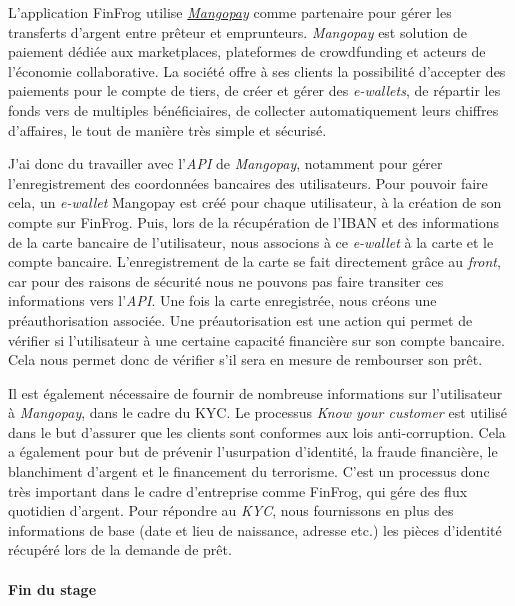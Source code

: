 L'application FinFrog utilise
\href{https://www.mangopay.com/fr/}{\emph{Mangopay}} comme partenaire
pour gérer les transferts d'argent entre prêteur et emprunteurs.
\emph{Mangopay} est solution de paiement dédiée aux marketplaces,
plateformes de crowdfunding et acteurs de l'économie collaborative. La
société offre à ses clients la possibilité d'accepter des paiements pour
le compte de tiers, de créer et gérer des \emph{e-wallets}, de répartir
les fonds vers de multiples bénéficiaires, de collecter automatiquement
leurs chiffres d'affaires, le tout de manière très simple et sécurisé.

\bigskip

J'ai donc du travailler avec l'\emph{API} de \emph{Mangopay}, notamment
pour gérer l'enregistrement des coordonnées bancaires des utilisateurs.
Pour pouvoir faire cela, un \emph{e-wallet} Mangopay est créé pour
chaque utilisateur, à la création de son compte sur FinFrog. Puis, lors
de la récupération de l'IBAN et des informations de la carte bancaire de
l'utilisateur, nous associons à ce \emph{e-wallet} à la carte et le
compte bancaire. L'enregistrement de la carte se fait directement grâce
au \emph{front}, car pour des raisons de sécurité nous ne pouvons pas
faire transiter ces informations vers l'\emph{API}. Une fois la carte
enregistrée, nous créons une préauthorisation associée. Une
préautorisation est une action qui permet de vérifier si l'utilisateur à
une certaine capacité financière sur son compte bancaire. Cela nous
permet donc de vérifier s'il sera en mesure de rembourser son prêt.

\bigskip

Il est également nécessaire de fournir de nombreuse informations sur
l'utilisateur à \emph{Mangopay}, dans le cadre du KYC. Le processus
\emph{Know your customer} est utilisé dans le but d'assurer que les
clients sont conformes aux lois anti-corruption. Cela a également pour
but de prévenir l'usurpation d'identité, la fraude financière, le
blanchiment d'argent et le financement du terrorisme. C'est un processus
donc très important dans le cadre d'entreprise comme FinFrog, qui gére
des flux quotidien d'argent. Pour répondre au \emph{KYC}, nous
fournissons en plus des informations de base (date et lieu de naissance,
adresse etc.) les pièces d'identité récupéré lors de la demande de prêt.

\bigskip

\paragraph{Fin du stage}\label{fin-du-stage}

